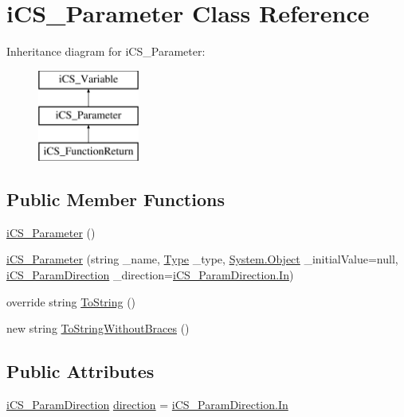 \hypertarget{classi_c_s___parameter}{\section{i\+C\+S\+\_\+\+Parameter Class Reference}
\label{classi_c_s___parameter}
}
Inheritance diagram for i\+C\+S\+\_\+\+Parameter\+:\begin{figure}[H]
\begin{center}
\leavevmode
\includegraphics[height=3.000000cm]{classi_c_s___parameter}
\end{center}
\end{figure}
\subsection*{Public Member Functions}
\begin{DoxyCompactItemize}
\item 
\hyperlink{classi_c_s___parameter_a8d8f7be3fbb865845057b8cf8c2f4c18}{i\+C\+S\+\_\+\+Parameter} ()
\item 
\hyperlink{classi_c_s___parameter_af968e084daaba12a02258d65464d4870}{i\+C\+S\+\_\+\+Parameter} (string \+\_\+name, \hyperlink{i_c_s___object_type_enum_8cs_ae6c3dd6d8597380b56d94908eb431547aa1fa27779242b4902f7ae3bdd5c6d508}{Type} \+\_\+type, \hyperlink{i_c_s___logic_8cs_a5b2c8b05b9a357906d7f9e5b2c1e154d}{System.\+Object} \+\_\+initial\+Value=null, \hyperlink{i_c_s___param_direction_8cs_a5b08eb56f49e721d7a9dc81f9206f782}{i\+C\+S\+\_\+\+Param\+Direction} \+\_\+direction=\hyperlink{i_c_s___param_direction_8cs_a5b08eb56f49e721d7a9dc81f9206f782aefeb369cccbd560588a756610865664c}{i\+C\+S\+\_\+\+Param\+Direction.\+In})
\item 
override string \hyperlink{classi_c_s___parameter_ad40e55db24fcd4a78714e17f87abc51b}{To\+String} ()
\item 
new string \hyperlink{classi_c_s___parameter_ae1dda738b718c5ca2ec34077fb2a5c93}{To\+String\+Without\+Braces} ()
\end{DoxyCompactItemize}
\subsection*{Public Attributes}
\begin{DoxyCompactItemize}
\item 
\hyperlink{i_c_s___param_direction_8cs_a5b08eb56f49e721d7a9dc81f9206f782}{i\+C\+S\+\_\+\+Param\+Direction} \hyperlink{classi_c_s___parameter_a5bc14747ea497e24d820902e83bd96ab}{direction} = \hyperlink{i_c_s___param_direction_8cs_a5b08eb56f49e721d7a9dc81f9206f782aefeb369cccbd560588a756610865664c}{i\+C\+S\+\_\+\+Param\+Direction.\+In}
\end{DoxyCompactItemize}



